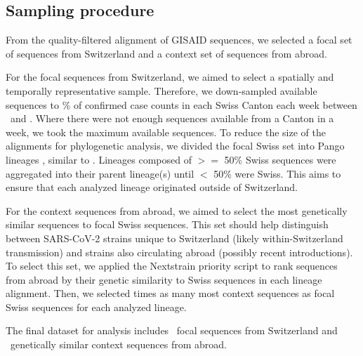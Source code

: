 \documentclass[9pt,twoside,lineno]{pnas-new} %
\begin{document}
\subsection*{Sampling procedure}

From the quality-filtered alignment of GISAID sequences, we selected a focal set of sequences from Switzerland and a context set of sequences from abroad. 

For the focal sequences from Switzerland, we aimed to select a spatially and temporally representative sample. Therefore, we down-sampled available sequences to \maxweeklysamplingpercent\% of confirmed case counts in each Swiss Canton each week between \mindate\ and \maxdate. Where there were not enough sequences available from a Canton in a week, we took the maximum available sequences. To reduce the size of the alignments for phylogenetic analysis, we divided the focal Swiss set into Pango lineages \cite{Rambaut}, similar to \cite{DuPlessis2021}. Lineages composed of $>=$ 50\% Swiss sequences were aggregated into their parent lineage(s) until $<$ 50\% were Swiss. This aims to ensure that each analyzed lineage originated outside of Switzerland.

For the context sequences from abroad, we aimed to select the most genetically similar sequences to focal Swiss sequences. This set should help distinguish between SARS-CoV-2 strains unique to Switzerland (likely within-Switzerland transmission) and strains also circulating abroad (possibly recent introductions). To select this set, we applied the Nextstrain priority script \cite{Nextstrain} to rank sequences from abroad by their genetic similarity to Swiss sequences in each lineage alignment. Then, we selected \similaritycontextscalefactor times as many most context sequences as focal Swiss sequences for each analyzed lineage. 

The final dataset for analysis includes \nfocalsamples\ focal sequences from Switzerland and \nsimcontext\ genetically similar context sequences from abroad.
\end{document}
